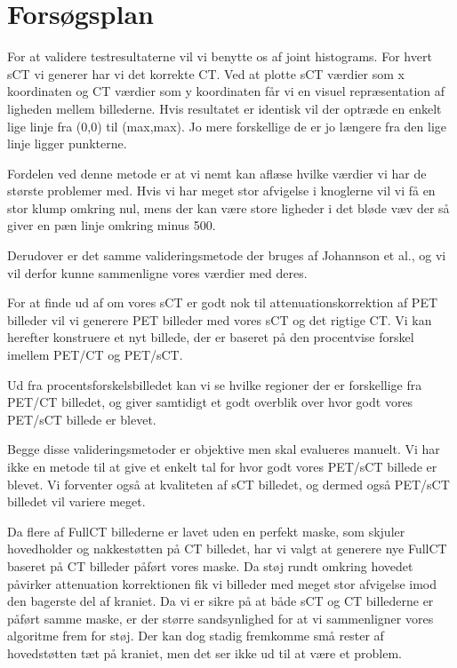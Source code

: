 \section{Forsøgsplan}

For at validere testresultaterne vil vi benytte os af joint histograms. For hvert sCT vi generer har vi det korrekte CT. Ved at plotte sCT værdier som x koordinaten og CT værdier som y koordinaten får vi en visuel repræsentation af ligheden mellem billederne. Hvis resultatet er identisk vil der optræde en enkelt lige linje fra (0,0) til (max,max). Jo mere forskellige de er jo længere fra den lige linje ligger punkterne.

Fordelen ved denne metode er at vi nemt kan aflæse hvilke værdier vi har de største problemer med. Hvis vi har meget stor afvigelse i knoglerne vil vi få en stor klump omkring nul, mens der kan være store ligheder i det bløde væv der så giver en pæn linje omkring minus 500.

Derudover er det samme valideringsmetode der bruges af Johannson et al., og vi vil derfor kunne sammenligne vores værdier med deres.

For at finde ud af om vores sCT er godt nok til attenuationskorrektion af PET billeder vil vi generere PET billeder med vores sCT og det rigtige CT. Vi kan herefter konstruere et nyt billede, der er baseret på den procentvise forskel imellem PET/CT og PET/sCT. 

Ud fra procentsforskelsbilledet kan vi se hvilke regioner der er forskellige fra PET/CT billedet, og giver samtidigt et godt overblik over hvor godt vores PET/sCT billede er blevet.

Begge disse valideringsmetoder er objektive men skal evalueres manuelt. Vi har ikke en metode til at give et enkelt tal for hvor godt vores PET/sCT billede er blevet. Vi forventer også at kvaliteten af sCT billedet, og dermed også PET/sCT billedet vil variere meget.


Da flere af FullCT billederne er lavet uden en perfekt maske, som skjuler hovedholder og nakkestøtten på CT billedet, har vi valgt at generere nye FullCT baseret på CT billeder påført vores maske. Da støj rundt omkring hovedet påvirker attenuation korrektionen fik vi billeder med meget stor afvigelse imod den bagerste del af kraniet. Da vi er sikre på at både sCT og CT billederne er påført samme maske, er der større sandsynlighed for at vi sammenligner vores algoritme frem for støj. Der kan dog stadig fremkomme små rester af hovedstøtten tæt på kraniet, men det ser ikke ud til at være et problem.

